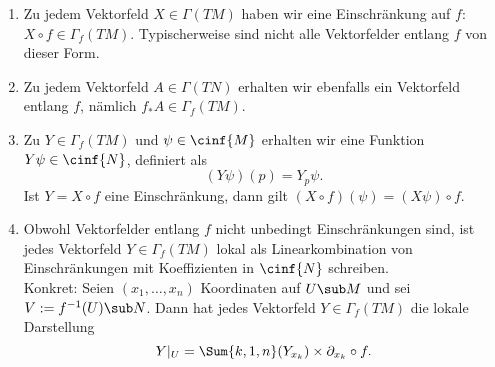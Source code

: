 \begin{bemerkungen}
\begin{enumerate}
\item Zu jedem Vektorfeld $X \in \Gamma(TM)$ haben wir eine Einschränkung auf $f$: $X \circ f \in \Gamma_f(TM)$. Typischerweise sind nicht alle Vektorfelder entlang $f$ von dieser Form.
\item Zu jedem Vektorfeld $A \in \Gamma (TN)$ erhalten wir ebenfalls ein Vektorfeld entlang $f$, nämlich $f_\ast A \in \Gamma_f(TM)$.
\begin{center}
\end{center}
\item Zu $Y \in \Gamma_f(TM)$ und $\psi \in \cinf{M}$ erhalten wir eine Funktion $Y \psi \in \cinf{N}$, definiert als
\begin{equation}
(Y \psi)(p) = Y_p \psi.
\end{equation}
Ist $Y=X \circ f$ eine Einschränkung, dann gilt $(X \circ f)(\psi) = (X \psi) \circ f$.
\item Obwohl Vektorfelder entlang $f$ nicht unbedingt Einschränkungen sind, ist jedes Vektorfeld $Y \in \Gamma_f(TM)$ lokal als Linearkombination von Einschränkungen mit Koeffizienten in $\cinf{N}$ schreiben.\\
Konkret: Seien $(x_1, \dots, x_n)$ Koordinaten auf $U \sub M$ und sei $V := f^{-1}(U) \sub N$. Dann hat jedes Vektorfeld $Y \in \Gamma_f(TM)$ die lokale Darstellung
\begin{equation}
Y|_U = \Sum{k,1,n} (Y_{x_k}) \times \partial_{x_k} \circ f.
\end{equation}
\end{enumerate}
\end{bemerkungen}
